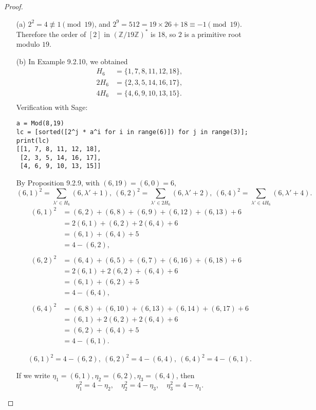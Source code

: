 \documentclass[11pt,a4paper]{article}
\newcommand{\Z}{\mathbb{Z}}
\begin{document}
\begin{proof}
\begin{enumerate}
\item[(a)]
$2^2=4\not \equiv 1\pmod {19}$, and $2^9=512 = 19\times26+18 \equiv -1\pmod{19}$. Therefore the order of $[2]$ in $(\Z/19\Z)^*$ is 1$8$, so $2$ is a primitive root modulo $19$.


\item[(b)]
In Example 9.2.10, we obtained
\begin{align*}
H_6 &= \{1,7,8,11,12,18\},\\
2H_6&=\{2,3,5,14,16,17\},\\
4H_6 &= \{4,6,9,10,13,15\}.\\
\end{align*}
Verification with Sage:
\begin{verbatim}
a = Mod(8,19)
lc = [sorted([2^j * a^i for i in range(6)]) for j in range(3)]; print(lc)
[[1, 7, 8, 11, 12, 18], 
 [2, 3, 5, 14, 16, 17], 
 [4, 6, 9, 10, 13, 15]]
\end{verbatim}

By Proposition 9.2.9, with $(6,19) = (6,0) = 6$,
$$(6,1)^2 = \sum_{\lambda'\in H_6}(6,\lambda'+1),\ (6,2)^2 = \sum_{\lambda'\in 2H_6}(6,\lambda'+2),\ (6,4)^2 = \sum_{\lambda'\in 4H_6}(6,\lambda'+4).$$
\begin{align*}
(6,1)^2 &=(6,2)+(6,8)+(6,9)+(6,12)+(6,13)+6\\
&=2(6,1)+(6,2)+2(6,4)+6\\
&=(6,1)+(6,4)+5\\
&=4 - (6,2),\\
\\
(6,2)^2&=(6,4)+(6,5)+(6,7)+(6,16)+(6,18)+6\\
&=2(6,1)+2(6,2)+(6,4)+6\\
&=(6,1)+(6,2)+5\\
&=4-(6,4),\\
\\
(6,4)^2&=(6,8)+(6,10)+(6,13)+(6,14)+(6,17)+6\\
&=(6,1)+2(6,2)+2(6,4)+6\\
&=(6,2)+(6,4)+5\\
&=4-(6,1).
\end{align*}

$$(6,1)^2= 4 - (6,2),\ (6,2)^2 = 4-(6,4),\ (6,4)^2 = 4 - (6,1).$$

If we write $\eta_1= (6,1), \eta_2 = (6,2), \eta_3 = (6,4)$, then
$$\eta_1^2 = 4 - \eta_2,\quad \eta_2^2 = 4 - \eta_3, \quad \eta_3^2 = 4 - \eta_1.$$



\end{enumerate}
\end{proof}
\end{document}
